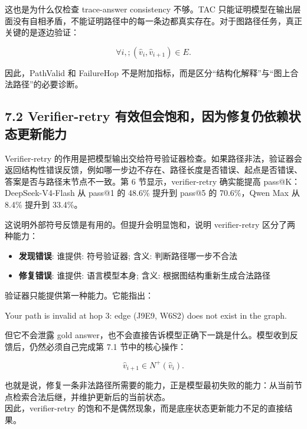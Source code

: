 \documentclass[
  11pt,
]{article}
\newenvironment{Shaded}{}{}
\newcommand{\NormalTok}[1]{#1}
\providecommand{\tightlist}{%
  \setlength{\itemsep}{0pt}\setlength{\parskip}{0pt}}
\begin{document}
这也是为什么仅检查 trace-answer consistency 不够。TAC
只能证明模型在输出层面没有自相矛盾，不能证明路径中的每一条边都真实存在。对于图路径任务，真正关键的是逐边验证：

\[
\forall i,;(\hat{v}_i,\hat{v}_{i+1})\in E.  
\]

因此，PathValid 和 FailureHop
不是附加指标，而是区分``结构化解释''与``图上合法路径''的必要诊断。

\subsection{7.2 Verifier-retry
有效但会饱和，因为修复仍依赖状态更新能力}\label{verifier-retry-ux6709ux6548ux4f46ux4f1aux9971ux548cux56e0ux4e3aux4feeux590dux4ecdux4f9dux8d56ux72b6ux6001ux66f4ux65b0ux80fdux529b}

Verifier-retry
的作用是把模型输出交给符号验证器检查。如果路径非法，验证器会返回结构性错误反馈，例如哪一步边不存在、路径长度是否错误、起点是否错误、答案是否与路径末节点不一致。第
6 节显示，verifier-retry 确实能提高 pass@K：DeepSeek-V4-Flash 从 pass@1
的 48.6\% 提升到 pass@5 的 70.6\%，Qwen Max 从 8.4\% 提升到 33.4\%。

这说明外部符号反馈是有用的。但提升会明显饱和，说明 verifier-retry
区分了两种能力：

\begin{itemize}
\tightlist
\item
  \textbf{发现错误}: 谁提供: 符号验证器; 含义: 判断路径哪一步不合法
\item
  \textbf{修复错误}: 谁提供: 语言模型本身; 含义:
  根据图结构重新生成合法路径
\end{itemize}

验证器只能提供第一种能力。它能指出：

\begin{Shaded}
\begin{Highlighting}[]
\NormalTok{Your path is invalid at hop 3:}
\NormalTok{edge (J9E9, W6S2) does not exist in the graph.}
\end{Highlighting}
\end{Shaded}

但它不会泄露 gold
answer，也不会直接告诉模型正确下一跳是什么。模型收到反馈后，仍然必须自己完成第
7.1 节中的核心操作：

\[
\hat{v}_{i+1}\in N^+(\hat{v}_i).  
\]

也就是说，修复一条非法路径所需要的能力，正是模型最初失败的能力：从当前节点检索合法后继，并维护更新后的当前状态。\\
因此，verifier-retry
的饱和不是偶然现象，而是底座状态更新能力不足的直接结果。
\end{document}
